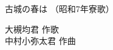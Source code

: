 \documentclass[10pt,b5j]{tarticle} %
\begin{document}
\begin{minipage}[c]{0.7\hsize} %
    \begin{center}
        {\LARGE
            古城の春は %
        }
        {\small 
            （昭和7年寮歌） %
        }
    \end{center}
\end{minipage}
\begin{minipage}[c]{0.3\hsize} %
    \begin{flushright} %
        大槻均君 作歌\\中村小弥太君 作曲 %
    \end{flushright}
\end{minipage}
\end{document}
